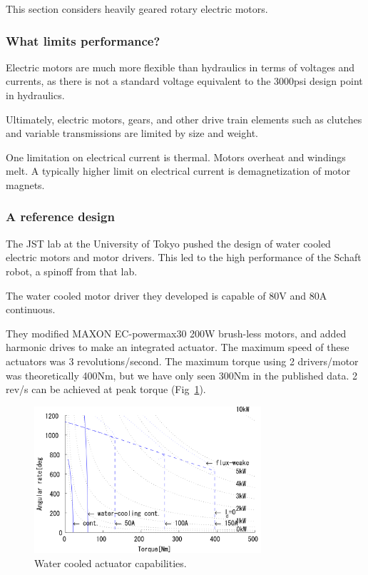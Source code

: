 \documentclass[letterpaper,12pt,fullpage]{article}
\begin{document}
This section considers heavily geared rotary electric motors.

\subsubsection{What limits performance?}

Electric motors are much more flexible than hydraulics in terms of voltages
and currents, as there is not a standard voltage equivalent to the 3000psi
design point in hydraulics.

Ultimately, electric motors, gears, and other drive train elements such
as clutches and variable transmissions are limited by size and weight.

One limitation on electrical current
is thermal. Motors overheat and windings melt.
A typically 
higher limit on electrical current is demagnetization of motor magnets.

\subsubsection{A reference design}

The JST lab at the University of Tokyo pushed the design of water
cooled electric motors and motor drivers. This led to the high
performance of the Schaft robot, a spinoff from that lab.

The water cooled motor driver they developed is capable of 80V and
80A continuous.~\cite{IEEE05649683}

They modified
MAXON EC-powermax30 200W brush-less motors, and added harmonic drives
to make an integrated actuator.
The maximum speed of these actuators was 3 revolutions/second.
The maximum torque using 2 drivers/motor was theoretically 400Nm, but
we have only seen 300Nm in the published data. 2 rev/s can be achieved
at peak torque (Fig~\ref{f:s1}).~\cite{IEEE05649683}

\begin{figure}[t]
\centering
\includegraphics[width=0.75\textwidth]{tech-figs/s1}
\caption{Water cooled actuator capabilities.}
\label{f:s1}
\end{figure}
\end{document}

